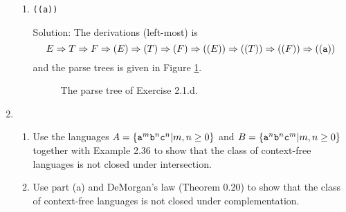 \begin{enumerate}[font=\bfseries,label=2.\arabic*]
\begin{enumerate}[font=\bfseries,label=\alph*.]
    \item {\tt ((a))}
    
    Solution: The derivations (left-most) is $$E\Rightarrow T\Rightarrow F\Rightarrow (E)\Rightarrow (T)\Rightarrow (F)\Rightarrow ((E))\Rightarrow ((T))\Rightarrow ((F))\Rightarrow (({\tt a}))$$ and the parse trees is given in Figure \ref{ex-2-1-d}.
    
    \begin{figure}
    \centering
    \caption{The parse tree of Exercise 2.1.d.}
    \label{ex-2-1-d}
    \end{figure}
\end{enumerate}


\item

\begin{enumerate}[font=\bfseries,label=\alph*.]
    \item Use the languages $A = \{{\tt a}^m {\tt b}^n {\tt c}^n | m, n\ge 0\}$ and $B = \{{\tt a}^n {\tt b}^n {\tt c}^m | m, n\ge 0\}$ together with Example 2.36 to show that the class of context-free languages is not closed under intersection.

    \item Use part (a) and DeMorgan’s law (Theorem 0.20) to show that the class of context-free languages is not closed under complementation.
\end{enumerate}



\end{enumerate}
